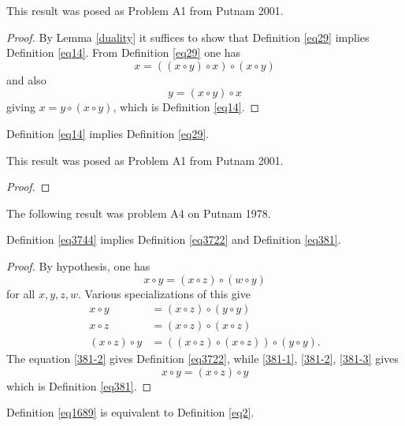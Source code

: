 This result was posed as Problem A1 from Putnam 2001.

\begin{proof}\leanok{} By Lemma \ref{duality} it suffices to show that Definition \ref{eq29} implies Definition \ref{eq14}.  From Definition \ref{eq29} one has
  $$ x = ((x \circ y) \circ x) \circ (x \circ y)$$
  and also
  $$ y = (x \circ y) \circ x$$
  giving $x = y \circ (x \circ y)$, which is Definition \ref{eq14}.
\end{proof}

\begin{theorem}[14 implies 29]\label{14_implies_29} \leanok  Definition \ref{eq14} implies Definition \ref{eq29}.
\end{theorem}

This result was posed as Problem A1 from Putnam 2001.

\begin{proof}\leanok
\end{proof}

The following result was problem A4 on Putnam 1978.

\begin{theorem}[3744 implies 3722, 381]\label{3744_implies_3722_381} Definition \ref{eq3744} implies Definition \ref{eq3722} and Definition \ref{eq381}.
\end{theorem}

\begin{proof} By hypothesis, one has
$$x \circ y = (x \circ z) \circ (w \circ y)
  $$
for all $x,y,z,w$.  Various specializations of this give
\begin{align}
 x \circ y &= (x \circ z) \circ (y \circ y) \label{381-1} \\
 x \circ z &= (x \circ z) \circ (x \circ z) \label{381-2} \\
(x \circ z) \circ y &= ((x \circ z) \circ (x \circ z)) \circ (y \circ y) \label{381-3}.
\end{align}
The equation \eqref{381-2} gives Definition \ref{eq3722}, while \eqref{381-1}, \eqref{381-2}, \eqref{381-3} gives
$$ x \circ y = (x\circ z) \circ y$$
which is Definition \ref{eq381}.
\end{proof}

\begin{theorem}[1689 is equivalent to 2]\label{1689_equiv_2} Definition \ref{eq1689} is equivalent to Definition \ref{eq2}.
\end{theorem}


